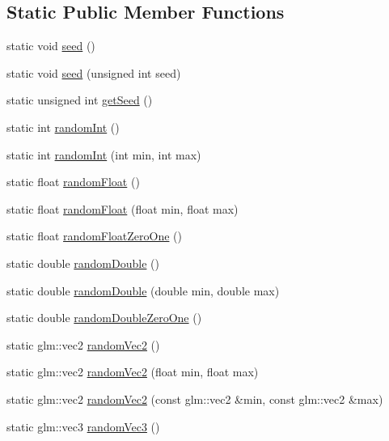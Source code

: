 \subsection*{Static Public Member Functions}
\begin{DoxyCompactItemize}
\item 
static void \mbox{\hyperlink{classec_1_1_random_a3e4ad02afb2979b3549fbd70e6f71412}{seed}} ()
\item 
static void \mbox{\hyperlink{classec_1_1_random_aa2b21cb97b3a7c36e89b8afda6ca500d}{seed}} (unsigned int seed)
\item 
static unsigned int \mbox{\hyperlink{classec_1_1_random_a59c8074b3adbaa81ad9e82d3f398b441}{get\+Seed}} ()
\item 
static int \mbox{\hyperlink{classec_1_1_random_a65aa91d5a51008a4c8b1ef03f42ede7a}{random\+Int}} ()
\item 
static int \mbox{\hyperlink{classec_1_1_random_a0519c84300b7bfaaf8854f013e949adf}{random\+Int}} (int min, int max)
\item 
static float \mbox{\hyperlink{classec_1_1_random_aac4221fbbea9b7deb106c9a9c7b870d3}{random\+Float}} ()
\item 
static float \mbox{\hyperlink{classec_1_1_random_ae00f0b2aff06c493c2d8e47b5c9c3de0}{random\+Float}} (float min, float max)
\item 
static float \mbox{\hyperlink{classec_1_1_random_a4b2cd2191091e926caf1a5e7ce455a04}{random\+Float\+Zero\+One}} ()
\item 
static double \mbox{\hyperlink{classec_1_1_random_a121adac4b6557b213e059b1e15bad496}{random\+Double}} ()
\item 
static double \mbox{\hyperlink{classec_1_1_random_a5b7ce52c95262159a19684eed32d2648}{random\+Double}} (double min, double max)
\item 
static double \mbox{\hyperlink{classec_1_1_random_a11f29fbbc13a8e5a5671a33945a858a1}{random\+Double\+Zero\+One}} ()
\item 
static glm\+::vec2 \mbox{\hyperlink{classec_1_1_random_a6da9a117b49917951c77e09f25f20b4a}{random\+Vec2}} ()
\item 
static glm\+::vec2 \mbox{\hyperlink{classec_1_1_random_a0a8e82e0563c6358ad18dae596451a87}{random\+Vec2}} (float min, float max)
\item 
static glm\+::vec2 \mbox{\hyperlink{classec_1_1_random_aa32c562218dee5bc1d76135be4384a26}{random\+Vec2}} (const glm\+::vec2 \&min, const glm\+::vec2 \&max)
\item 
static glm\+::vec3 \mbox{\hyperlink{classec_1_1_random_a4242b9cac76d3e88bde39826ddbd6e3c}{random\+Vec3}} ()

\end{DoxyCompactItemize}
